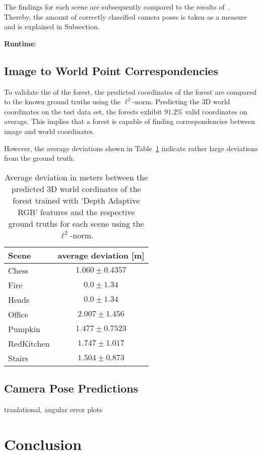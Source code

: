 \documentclass[final]{cvpr}
\begin{document}
The findings for each scene are subsequently compared
to the results of~\cite{shotton2013}. Thereby, the amount of correctly classified camera poses is taken as a measure 
and is explained in Subsection.

\textbf{Runtime}: 



\subsection{Image to World Point Correspondencies}
To validate the  of the forest, the predicted coordinates of the forest are compared to the known ground truths using 
the $\ell^2$-norm. Predicting the 3D world coordinates on the test data set, the forests exhibit
$91.2\%$ valid coordinates on average. This implies that a forest is capable of finding correspondencies between 
image and world coordinates. 

However, the average deviations shown in Table~\ref{tab:forest-error} indicate rather 
large deviations from the ground truth. %

\begin{table}[h]
	\begin{center}
	\begin{tabular}{|l|c|}
	\hline
	Scene & average deviation [m]\\
	\hline\hline
	Chess 		& 	$1.060 \pm 0.4357$ \\
	Fire 		& 	$0.0 \pm 1.34$	\\
	Heads 		& 	$0.0 \pm 1.34$	\\
	Office 		&   $2.007 \pm 1.456$ \\
	Pumpkin 	& 	$1.477 \pm 0.7523$ \\
	RedKitchen 	& 	$1.747 \pm 1.017$ \\
	Stairs 		& 	$1.504 \pm 0.873$ \\
	\hline
	\end{tabular}
	\end{center}
	\label{tab:forest-error}
	\caption{Average deviation in meters between the predicted 3D world cordinates of the forest trained with 
	'Depth Adaptive RGB' features and the respective ground truths for each scene using the $\ell^2$-norm.}
\end{table}



\subsection{Camera Pose Predictions}
tranlational, angular error
plots

\section{Conclusion}

{\small


}
\end{document}
